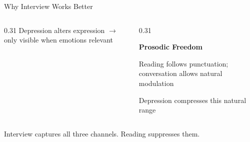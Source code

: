 \documentclass[aspectratio=169,11pt]{beamer}
\begin{document}
\begin{frame}{Why Interview Works Better}
\begin{columns}[T]
\begin{column}{0.31\textwidth}
            \footnotesize\color{darkgrey}
            Depression alters expression $\rightarrow$ only visible when emotions relevant
        \end{column}
        
        \begin{column}{0.31\textwidth}
            \begin{center}
                {\Large\color{accentblue}\faWaveSquare}
                
                \vspace{0.2cm}
                
                \textbf{Prosodic Freedom}
            \end{center}
            
            \vspace{0.2cm}
            
            \small
            Reading follows punctuation; conversation allows natural modulation
            
            \vspace{0.2cm}
            
            \footnotesize\color{darkgrey}
            Depression compresses this natural range
        \end{column}
    \end{columns}
    
    \vspace{0.5cm}
    
    \begin{center}
        \color{darkgrey}\small
        Interview captures all three channels. Reading suppresses them.
    \end{center}
\end{frame}
\end{document}
